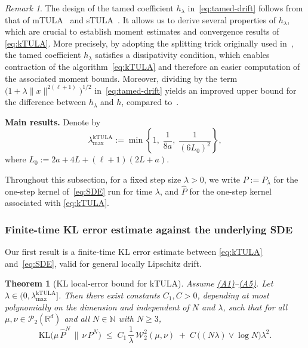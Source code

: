 \documentclass[11pt,a4paper,reqno]{amsart}
\theoremstyle{plain}
\newtheorem{theorem}{Theorem}
\theoremstyle{definition}
\theoremstyle{remark}
\newtheorem{remark}{Remark}
\newcommand{\R}{\mathbb{R}}
\newcommand{\KL}{\mathrm{KL}}
\newcommand{\W}{\mathcal{W}_2}
\begin{document}
\begin{remark}
The design of the tamed coefficient $h_\lambda$ in~\eqref{eq:tamed-drift} follows from that of
mTULA~\cite{neufeld2024nonasymptoticconvergenceboundsmodified} and sTULA~\cite{lytras2025taming}. It allows us to derive several properties of $h_\lambda$, which are crucial to establish moment estimates and convergence results of
\eqref{eq:kTULA}. More precisely, by adopting the splitting trick originally used
in~\cite{lytras2025taming}, the tamed coefficient $h_\lambda$ satisfies a dissipativity condition, which enables contraction of the algorithm~\eqref{eq:kTULA} and therefore an
easier computation of the associated moment bounds. Moreover, dividing by the term
$\bigl(1+\lambda\|x\|^{2(\ell+1)}\bigr)^{1/2}$ in~\eqref{eq:tamed-drift} yields an
improved upper bound for the difference between $h_\lambda$ and $h$, compared
to~\cite{lytras2025taming}.
\end{remark}

\medskip
\noindent\textbf{Main results.}
Denote by
\begin{equation}\label{eq:lambda-max}
\lambda_{\max}^{\mathrm{kTULA}}
:=
\min\left\{
1,\;
\frac{1}{8a},\;
\frac{1}{(6L_0)^2}
\right\},
\end{equation}
where $L_0 := 2a + 4L + (\ell+1)(2L+a)$.

\medskip
\noindent
Throughout this subsection, for a fixed step size $\lambda>0$, we write $P:=P_\lambda$ for the one-step kernel of~\eqref{eq:SDE} run for time $\lambda$, and $\widehat P$ for the one-step kernel associated with \eqref{eq:kTULA}.

\subsubsection{Finite-time KL error estimate against the underlying SDE}
\label{subsubsec:ktula-general}

Our first result is a finite-time KL error estimate between \eqref{eq:kTULA} and~\eqref{eq:SDE}, valid for general locally Lipschitz drift.

\begin{theorem}[KL local-error bound for kTULA]
\label{thm:kl-local-kTULA}
Assume \hyperref[ass:PJG]{\textup{(A1)}}--\hyperref[ass:JLC]{\textup{(A5)}}.
Let $\lambda\in(0,\lambda_{\max}^{\mathrm{kTULA}}]$.
Then there exist constants $C_1,C>0$, depending at most polynomially on the dimension and independent of $N$ and $\lambda$, such that for all $\mu,\nu\in\mathcal P_2(\R^d)$ and all $N\in\mathbb N$ with $N\ge3$,
\begin{equation}\label{eq:kl-ktula-final}
\KL\!\bigl(\mu\,\widehat P^{N}\,\big\|\,\nu\,P^{N}\bigr)
\;\le\;
C_1\,\frac{1}{\lambda}\,\W^2(\mu,\nu)
\;+\;
C\,\bigl((N\lambda)\vee \log N\bigr)\lambda^2.
\end{equation}
\end{theorem}
\end{document}
